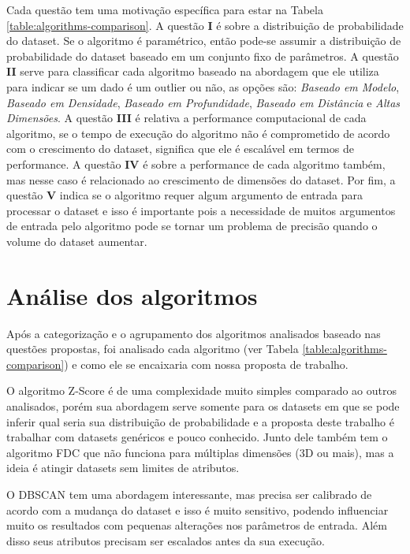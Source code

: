 Cada questão tem uma motivação específica para estar na Tabela \ref{table:algorithms-comparison}. A questão \textbf{I} é sobre a distribuição de probabilidade do dataset. Se o algoritmo é paramétrico, então pode-se assumir a distribuição de probabilidade do dataset baseado em um conjunto fixo de parâmetros. A questão \textbf{II} serve para classificar cada algoritmo baseado na abordagem que ele utiliza para indicar se um dado é um outlier ou não, as opções são: \textit{Baseado em Modelo}, \textit{Baseado em Densidade}, \textit{Baseado em Profundidade}, \textit{Baseado em Distância} e \textit{Altas Dimensões}. A questão \textbf{III} é relativa a performance computacional de cada algoritmo, se o tempo de execução do algoritmo não é comprometido de acordo com o crescimento do dataset, significa que ele é escalável em termos de performance. A questão \textbf{IV} é sobre a performance de cada algoritmo também, mas nesse caso é relacionado ao crescimento de dimensões do dataset. Por fim, a questão \textbf{V} indica se o algoritmo requer algum argumento de entrada para processar o dataset e isso é importante pois a necessidade de muitos argumentos de entrada pelo algoritmo pode se tornar um problema de precisão quando o volume do dataset aumentar.

\section{Análise dos algoritmos}

Após a categorização e o agrupamento dos algoritmos analisados baseado nas questões propostas, foi analisado cada algoritmo (ver Tabela \ref{table:algorithms-comparison}) e como ele se encaixaria com nossa proposta de trabalho.

O algoritmo Z-Score é de uma complexidade muito simples comparado ao outros analisados, porém sua abordagem serve somente para os datasets em que se pode inferir qual seria sua distribuição de probabilidade e a proposta deste trabalho é trabalhar com datasets genéricos e pouco conhecido. Junto dele também tem o algoritmo FDC que não funciona para múltiplas dimensões (3D ou mais), mas a ideia é atingir datasets sem limites de atributos.

O DBSCAN tem uma abordagem interessante, mas precisa ser calibrado de acordo com a mudança do dataset e isso é muito sensitivo, podendo influenciar muito os resultados com pequenas alterações nos parâmetros de entrada. Além disso seus atributos precisam ser escalados antes da sua execução.


